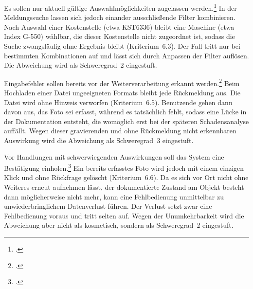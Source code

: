 Es sollen nur aktuell gültige Auswahlmöglichkeiten zugelassen
werden.\footcite[Vgl.][Abschnitt~5.6.2.3]{DIN_ISO_9241-110:2020}
In der Meldungssuche lassen sich jedoch einander ausschließende Filter
kombinieren.
Nach Auswahl einer Kostenstelle (etwa KST6336) bleibt eine Maschine (etwa
Index G-550) wählbar, die dieser Kostenstelle nicht zugeordnet ist, sodass die
Suche zwangsläufig ohne Ergebnis bleibt (Kriterium~6.3).
Der Fall tritt nur bei bestimmten Kombinationen auf und lässt sich durch Anpassen
der Filter auflösen.
Die Abweichung wird als Schweregrad~2 eingestuft.

Eingabefehler sollen bereits vor der Weiterverarbeitung erkannt
werden.\footcite[Vgl.][Abschnitt~5.6.2.5]{DIN_ISO_9241-110:2020}
Beim Hochladen einer Datei ungeeigneten Formats bleibt jede Rückmeldung aus.
Die Datei wird ohne Hinweis verworfen (Kriterium~6.5).
Benutzende gehen dann davon aus, das Foto sei erfasst, während es tatsächlich
fehlt, sodass eine Lücke in der Dokumentation entsteht, die womöglich erst bei
der späteren Schadensanalyse auffällt.
Wegen dieser gravierenden und ohne Rückmeldung nicht erkennbaren Auswirkung wird
die Abweichung als Schweregrad~3 eingestuft.

Vor Handlungen mit schwerwiegenden Auswirkungen soll das System eine Bestätigung
einholen.\footcite[Vgl.][Abschnitt~5.6.2.6]{DIN_ISO_9241-110:2020}
Ein bereits erfasstes Foto wird jedoch mit einem einzigen Klick und ohne Rückfrage
gelöscht (Kriterium~6.6).
Da es sich vor Ort nicht ohne Weiteres erneut aufnehmen lässt, der dokumentierte
Zustand am Objekt besteht dann möglicherweise nicht mehr, kann eine Fehlbedienung
unmittelbar zu unwiederbringlichem Datenverlust führen.
Der Verlust setzt zwar eine Fehlbedienung voraus und tritt selten auf.
Wegen der Unumkehrbarkeit wird die Abweichung aber nicht als kosmetisch, sondern
als Schweregrad~2 eingestuft.

